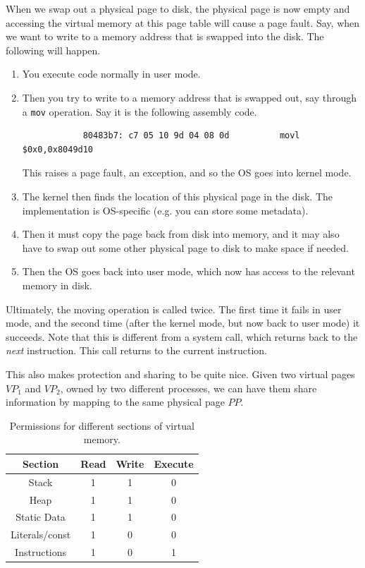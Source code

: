 \documentclass{article}
\begin{document}
    \begin{example} 
      When we swap out a physical page to disk, the physical page is now empty and accessing the virtual memory at this page table will cause a page fault. Say, when we want to write to a memory address that is swapped into the disk. The following will happen. 
      \begin{enumerate}
        \item You execute code normally in user mode. 
        \item Then you try to write to a memory address that is swapped out, say through a \texttt{mov} operation. Say it is the following assembly code. 

          \begin{lstlisting}
            80483b7: c7 05 10 9d 04 08 0d          movl $0x0,0x8049d10  
          \end{lstlisting}
          This raises a page fault, an exception, and so the OS goes into kernel mode. 
        \item The kernel then finds the location of this physical page in the disk. The implementation is OS-specific (e.g. you can store some metadata). 
        \item Then it must copy the page back from disk into memory, and it may also have to swap out some other physical page to disk to make space if needed.  
        \item Then the OS goes back into user mode, which now has access to the relevant memory in disk. 
      \end{enumerate}
      Ultimately, the moving operation is called twice. The first time it fails in user mode, and the second time (after the kernel mode, but now back to user mode) it succeeds. Note that this is different from a system call, which returns back to the \textit{next} instruction. This call returns to the current instruction. 
    \end{example}

    \begin{definition}
      This also makes protection and sharing to be quite nice. Given two virtual pages $VP_1$ and $VP_2$, owned by two different processes, we can have them share information by mapping to the same physical page $PP$. 
      \begin{table}[H] 
        \centering 
        \begin{tabular}{|c|c|c|c|}
        \hline
        \textbf{Section} & \textbf{Read} & \textbf{Write} & \textbf{Execute} \\
        \hline
        Stack & 1 & 1 & 0 \\
        \hline
        Heap & 1 & 1 & 0 \\
        \hline
        Static Data & 1 & 1 & 0 \\
        \hline
        Literals/const & 1 & 0 & 0 \\
        \hline
        Instructions & 1 & 0 & 1 \\
        \hline
        \end{tabular}
        \caption{Permissions for different sections of virtual memory.}
      \end{table}
    \end{definition}
\end{document}
